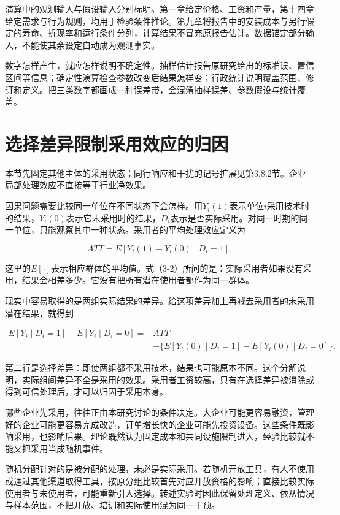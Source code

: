 \documentclass[UTF8,fontset=windows,12pt,a4paper,oneside,openany]{ctexbook}
\begin{document}
演算中的观测输入与假设输入分别标明。第一章给定价格、工资和产量，第十四章给定需求与行为规则，均用于检验条件推论。第九章将报告中的安装成本与另行假定的寿命、折现率和运行条件分列，计算结果不冒充原报告估计。数据锚定部分输入，不能使其余设定自动成为观测事实。

数字怎样产生，就应怎样说明不确定性。抽样估计报告原研究给出的标准误、置信区间等信息；确定性演算检查参数改变后结果怎样变；行政统计说明覆盖范围、修订和定义。把三类数字都画成一种误差带，会混淆抽样误差、参数假设与统计覆盖。

\section{选择差异限制采用效应的归因}

本节先固定其他主体的采用状态；同行响应和干扰的记号扩展见第3.8.2节。企业局部处理效应不直接等于行业净效果。

因果问题需要比较同一单位在不同状态下会怎样。用\(Y_i(1)\)表示单位\(i\)采用技术时的结果，\(Y_i(0)\)表示它未采用时的结果，\(D_i\)表示是否实际采用。对同一时期的同一单位，只能观察其中一种状态。采用者的平均处理效应定义为

\[
ATT=E[Y_i(1)-Y_i(0)\mid D_i=1].
\tag{3-2}
\]

这里的\(E[\cdot]\)表示相应群体的平均值。式（3-2）所问的是：实际采用者如果没有采用，结果会相差多少。它没有把所有潜在使用者都作为同一群体。

现实中容易取得的是两组实际结果的差异。给这项差异加上再减去采用者的未采用潜在结果，就得到

\[
\begin{aligned}
E[Y_i\mid D_i=1]-E[Y_i\mid D_i=0]
={}&ATT\\
&+\{E[Y_i(0)\mid D_i=1]-E[Y_i(0)\mid D_i=0]\}.
\end{aligned}
\tag{3-3}
\]

第二行是选择差异：即使两组都不采用技术，结果也可能原本不同。这个分解说明，实际组间差异不全是采用的效果。采用者工资较高，只有在选择差异被消除或得到可信处理后，才可以归因于采用本身。

哪些企业先采用，往往正由本研究讨论的条件决定。大企业可能更容易融资，管理好的企业可能更容易完成改造，订单增长快的企业可能先投资设备。这些条件既影响采用，也影响后果。理论既然认为固定成本和共同设施限制进入，经验比较就不能又把采用当成随机事件。

随机分配针对的是被分配的处理，未必是实际采用。若随机开放工具，有人不使用或通过其他渠道取得工具，按原分组比较首先对应开放资格的影响；直接比较实际使用者与未使用者，可能重新引入选择。转述实验时因此保留处理定义、依从情况与样本范围，不把开放、培训和实际使用混为同一干预。
\end{document}
